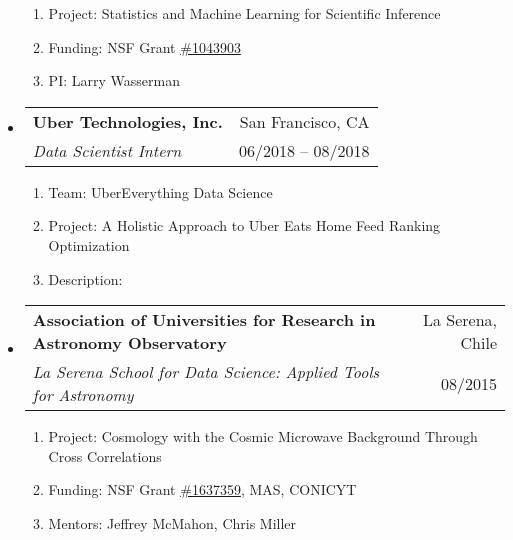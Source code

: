 \documentclass[letterpaper,10pt]{article}
\makeatletter
\newcommand{\subheadingtwolines}[4]{
\begin{tabular*}{6.45in}{l@{\cftdotfill{\cftsecdotsep}\extracolsep{\fill}}r}
#1 & #2 \\
#3 & #4 \\
\end{tabular*}}
\makeatother
\begin{document}
\begin{itemize}[leftmargin=0.4cm, itemsep=0.5cm]
\begin{enumerate}[leftmargin=0.5cm, itemsep=-0.05ex]
	\item[] Project: Statistics and Machine Learning for Scientific Inference
	\item[] Funding: NSF Grant \href{https://www.nsf.gov/awardsearch/showAward?AWD_ID=1043903&HistoricalAwards=false}{\#1043903}
	\item[] PI: Larry Wasserman
\end{enumerate}


\item[] \hspace{-2ex}\subheadingtwolines{\bf Uber Technologies, Inc.}{San Francisco, CA}{\it Data Scientist Intern}{06/2018 -- 08/2018}

\begin{enumerate}[leftmargin=0.5cm, itemsep=-0.05ex]
	\item[] Team: UberEverything Data Science
	\item[] Project: A Holistic Approach to Uber Eats Home Feed Ranking Optimization
	\item[] Description:
\vspace{-0.1cm}
{}
\end{enumerate}


\item[] \hspace{-2ex}\subheadingtwolines{\bf Association of Universities for Research in Astronomy Observatory}{La Serena, Chile}{\it La Serena School for Data Science: Applied Tools for Astronomy}{08/2015}

\begin{enumerate}[leftmargin=0.5cm, itemsep=-0.05ex]
	\item[] Project: Cosmology with the Cosmic Microwave Background Through Cross Correlations
	\item[] Funding: NSF Grant \href{https://www.nsf.gov/awardsearch/showAward?AWD_ID=1637359&HistoricalAwards=false}{\#1637359}, MAS, CONICYT
	\item[] Mentors: Jeffrey McMahon, Chris Miller
\end{enumerate}



\end{itemize}
\end{document}

